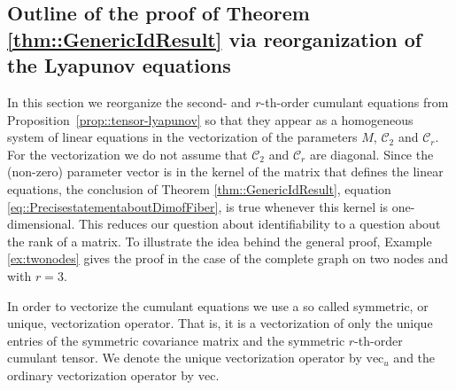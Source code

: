 \documentclass{biometrika}
\begin{document}
\subsection{Outline of the proof of Theorem \ref{thm::GenericIdResult} via reorganization of the Lyapunov equations}
\label{sec:proof-reorganize}

In this section we reorganize the second- and $r$-th-order cumulant equations from 
Proposition~\ref{prop::tensor-lyapunov}
so that they appear as a homogeneous system of linear equations in the vectorization of the parameters 
$M$, $\mathcal{C}_2$ and $\mathcal{C}_r$. For the vectorization we do not assume that 
$\mathcal{C}_2$ and $\mathcal{C}_r$ are diagonal. Since the (non-zero) parameter vector is in the kernel of the 
matrix that defines the linear equations, the conclusion of Theorem \ref{thm::GenericIdResult}, equation \eqref{eq::PrecisestatementaboutDimofFiber},
is true whenever this kernel is one-dimensional. This reduces our question about identifiability 
to a question about the rank of a matrix. To illustrate the idea behind the general proof,
Example \ref{ex:twonodes} gives the proof in the case of the complete graph on two nodes and with $r = 3$. 





In order to vectorize the cumulant equations we use a so called symmetric, or unique, vectorization 
operator. That is, it is a vectorization of only the unique entries of the symmetric covariance matrix and the symmetric $r$-th-order cumulant tensor. We denote the unique vectorization operator by $\mathrm{vec}_u$ and the ordinary vectorization operator by $\mathrm{vec}$.
\end{document}
